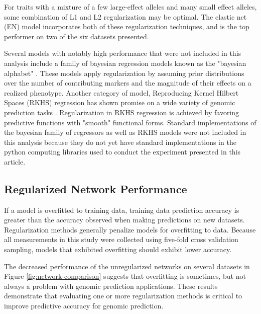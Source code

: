 For traits with a mixture of a few large-effect alleles and many small 
effect alleles, some combination of L1 and L2 regularization may be optimal. 
The elastic net (EN) model incorporates both of these regularization
techniques, and is the top performer on two of the six datasets presented.

Several models with notably high performance that were not included in this analysis include a
family of bayesian regression models known as the "bayesian alphabet" \citep{gianola2009}. These
models apply regularization by assuming prior distributions over the number of contributing markers
and the magnitude of their effects on a realized phenotype. Another category of model, Reproducing 
Kernel Hilbert Spaces (RKHS) regression has shown promise on a wide variety of genomic 
prediction tasks \citep{heslot2012, gianola2008}. Regularization in RKHS regression is achieved
by favoring predictive functions with "smooth" functional forms. Standard implementations
of the bayesian family of regressors as well as RKHS models were not included in this analysis
because they do not yet have standard implementations in the python computing libraries used 
to conduct the experiment presented in this article.

\ifdefined\showtablesandfigures
\fi

\subsection*{Regularized Network Performance}

If a model is overfitted to training data, training data prediction accuracy is greater than 
the accuracy observed when making predictions on new datasets. Regularization methods
generally penalize models for overfitting to data. Because all measurements in this study 
were collected using five-fold cross validation sampling, models that exhibited overfitting 
should exhibit lower accuracy. 

The decreased performance of the unregularized networks on several datasets in Figure 
\ref{fig:network-comparison} suggests that overfitting is sometimes, but not always
a problem with genomic prediction applications. These results demonstrate that 
evaluating one or more regularization methods is critical to improve predictive accuracy for 
genomic prediction.

\ifdefined\showtablesandfigures
\fi

